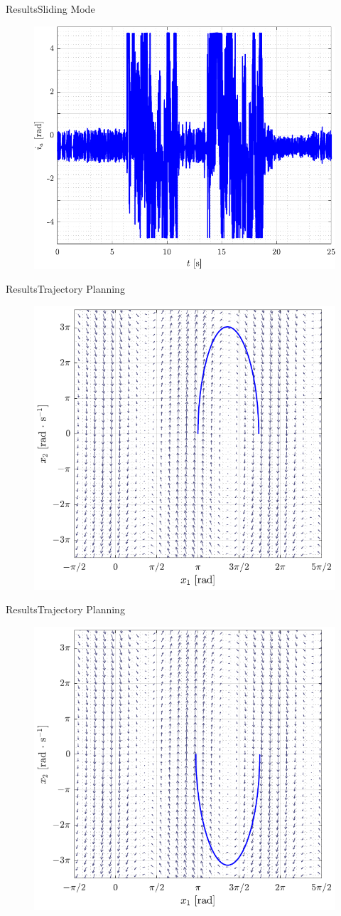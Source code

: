 \begin{frame}{Results}{Sliding Mode}
\begin{figure}[H]
  \includegraphics[width=.7\textwidth]{figures/slidingModeTest2ia}
\end{figure}
\end{frame}

  
\begin{frame}{Results}{Trajectory Planning}
\begin{figure}[H]
  \includegraphics[width=.6\textwidth]{figures/firstTraj}
\end{figure}
\end{frame}

\begin{frame}{Results}{Trajectory Planning}
\begin{figure}[H]
  \includegraphics[width=.6\textwidth]{figures/thirdTraj}
\end{figure}
\end{frame}

